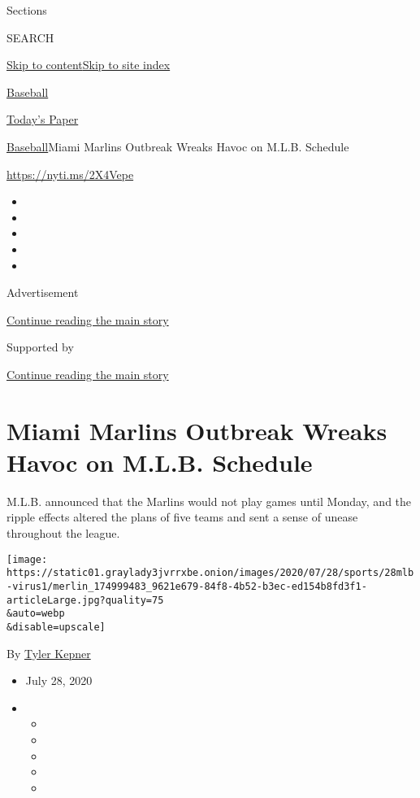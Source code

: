 Sections

SEARCH

\protect\hyperlink{site-content}{Skip to
content}\protect\hyperlink{site-index}{Skip to site index}

\href{https://www.nytimes3xbfgragh.onion/section/sports/baseball}{Baseball}

\href{https://myaccount.nytimes3xbfgragh.onion/auth/login?response_type=cookie\&client_id=vi}{}

\href{https://www.nytimes3xbfgragh.onion/section/todayspaper}{Today's
Paper}

\href{/section/sports/baseball}{Baseball}\textbar{}Miami Marlins
Outbreak Wreaks Havoc on M.L.B. Schedule

\url{https://nyti.ms/2X4Vepe}

\begin{itemize}
\item
\item
\item
\item
\item
\end{itemize}

Advertisement

\protect\hyperlink{after-top}{Continue reading the main story}

Supported by

\protect\hyperlink{after-sponsor}{Continue reading the main story}

\hypertarget{miami-marlins-outbreak-wreaks-havoc-on-mlb-schedule}{%
\section{Miami Marlins Outbreak Wreaks Havoc on M.L.B.
Schedule}\label{miami-marlins-outbreak-wreaks-havoc-on-mlb-schedule}}

M.L.B. announced that the Marlins would not play games until Monday, and
the ripple effects altered the plans of five teams and sent a sense of
unease throughout the league.

\texttt{[image: https://static01.graylady3jvrrxbe.onion/images/2020/07/28/sports/28mlb-virus1/merlin\_174999483\_9621e679-84f8-4b52-b3ec-ed154b8fd3f1-articleLarge.jpg?quality=75\\\&auto=webp\\\&disable=upscale]}

By \href{https://www.nytimes3xbfgragh.onion/by/tyler-kepner}{Tyler
Kepner}

\begin{itemize}
\item
  July 28, 2020
\item
  \begin{itemize}
  \item
  \item
  \item
  \item
  \item
  \end{itemize}
\end{itemize}

